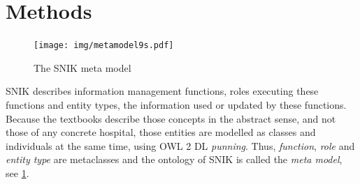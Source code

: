 \documentclass{IOS-Book-Article}     %
\newcommand{\citep}{\cite}%
\newcommand{\snikversion}{1.3.0}
\newcommand{\snikversionlink}{\href{https://github.com/snikproject/ontology/releases/tag/\snikversion}{\snikversion}}
\begin{document}
\section{Methods}

\begin{figure}
\caption{The SNIK meta model}
\label{fig:metamodel}
\centering
\texttt{[image: img/metamodel9s.pdf]}
\end{figure}

SNIK describes information management functions, roles executing these functions and entity types, the information used or updated by these functions.
Because the textbooks describe those concepts in the abstract sense, and not those of any concrete hospital, those entities are modelled as classes and individuals at the same time, using OWL 2 DL \emph{punning}.
Thus, \emph{function}, \emph{role} and \emph{entity type} are metaclasses and the ontology of SNIK is called the \emph{meta model}, see \cref{fig:metamodel}.
%
\end{document}
